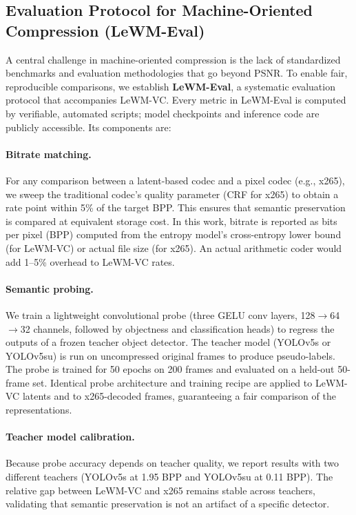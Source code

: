\documentclass{article}
\begin{document}
\subsection{Evaluation Protocol for Machine-Oriented Compression (LeWM-Eval)}
\label{sec:eval_protocol}

A central challenge in machine-oriented compression is the lack of standardized benchmarks and evaluation methodologies that go beyond PSNR. To enable fair, reproducible comparisons, we establish \textbf{LeWM-Eval}, a systematic evaluation protocol that accompanies LeWM-VC. Every metric in LeWM-Eval is computed by verifiable, automated scripts; model checkpoints and inference code are publicly accessible. Its components are:

\paragraph{Bitrate matching.}
For any comparison between a latent-based codec and a pixel codec (e.g., x265), we sweep the traditional codec's quality parameter (CRF for x265) to obtain a rate point within 5\% of the target BPP. This ensures that semantic preservation is compared at equivalent storage cost. In this work, bitrate is reported as bits per pixel (BPP) computed from the entropy model's cross-entropy lower bound (for LeWM-VC) or actual file size (for x265). An actual arithmetic coder would add 1--5\% overhead to LeWM-VC rates.

\paragraph{Semantic probing.}
We train a lightweight convolutional probe (three GELU conv layers, 128$\rightarrow$64$\rightarrow$32 channels, followed by objectness and classification heads) to regress the outputs of a frozen teacher object detector. The teacher model (YOLOv5s or YOLOv5su) is run on uncompressed original frames to produce pseudo-labels. The probe is trained for 50 epochs on 200 frames and evaluated on a held-out 50-frame set. Identical probe architecture and training recipe are applied to LeWM-VC latents and to x265-decoded frames, guaranteeing a fair comparison of the representations.

\paragraph{Teacher model calibration.}
Because probe accuracy depends on teacher quality, we report results with two different teachers (YOLOv5s at 1.95 BPP and YOLOv5su at 0.11 BPP). The relative gap between LeWM-VC and x265 remains stable across teachers, validating that semantic preservation is not an artifact of a specific detector.
\end{document}
